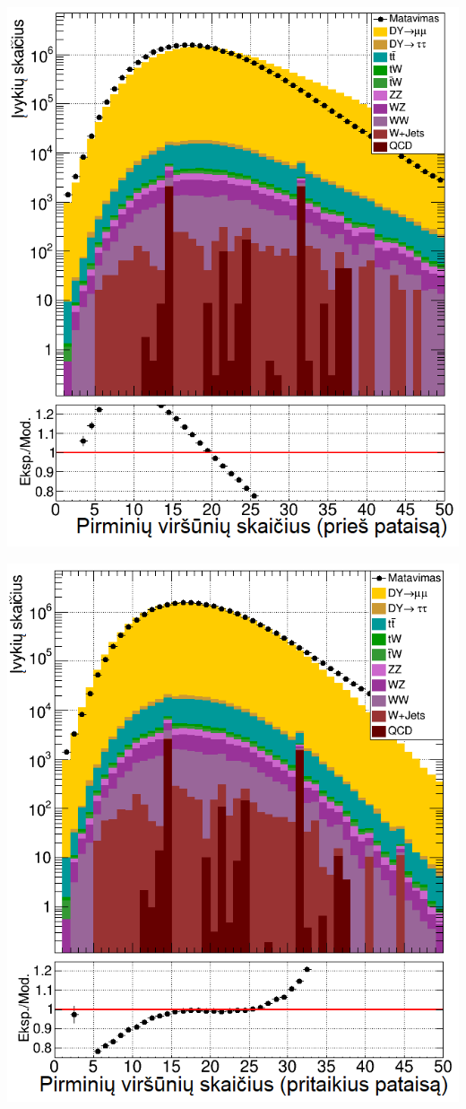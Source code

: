 \documentclass[a4paper, 12pt]{article}
\begin{document}
\begin{centering}
	\begin{minipage}[t]{0.49\linewidth}
		\includegraphics[width=1\linewidth]{mumuNVTXbefore_SMALL.png}
	\end{minipage}
	\hfill
	\begin{minipage}[t]{0.49\linewidth}
		\includegraphics[width=1\linewidth]{mumuNVTXafter_SMALL.png}

\end{minipage}
\end{centering}
\end{document}
